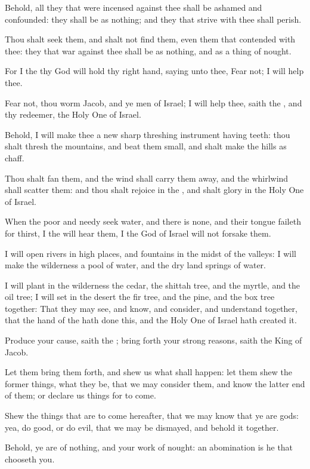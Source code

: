 \Verse Behold, all they that were incensed against thee shall be ashamed and confounded: they shall be as nothing; and they that strive with thee shall perish.

\Verse Thou shalt seek them, and shalt not find them, even them that contended with thee: they that war against thee shall be as nothing, and as a thing of nought.

\Verse For I the \LORD thy God will hold thy right hand, saying unto thee, Fear not; I will help thee.

\Verse Fear not, thou worm Jacob, and ye men of Israel; I will help thee, saith the \LORD, and thy redeemer, the Holy One of Israel.

\Verse Behold, I will make thee a new sharp threshing instrument having teeth: thou shalt thresh the mountains, and beat them small, and shalt make the hills as chaff.

\Verse Thou shalt fan them, and the wind shall carry them away, and the whirlwind shall scatter them: and thou shalt rejoice in the \LORD, and shalt glory in the Holy One of Israel.

\Verse When the poor and needy seek water, and there is none, and their tongue faileth for thirst, I the \LORD will hear them, I the God of Israel will not forsake them.

\Verse I will open rivers in high places, and fountains in the midst of the valleys: I will make the wilderness a pool of water, and the dry land springs of water.

\Verse I will plant in the wilderness the cedar, the shittah tree, and the myrtle, and the oil tree; I will set in the desert the fir tree, and the pine, and the box tree together: \Verse That they may see, and know, and consider, and understand together, that the hand of the \LORD hath done this, and the Holy One of Israel hath created it.

\Verse Produce your cause, saith the \LORD; bring forth your strong reasons, saith the King of Jacob.

\Verse Let them bring them forth, and shew us what shall happen: let them shew the former things, what they be, that we may consider them, and know the latter end of them; or declare us things for to come.

\Verse Shew the things that are to come hereafter, that we may know that ye are gods: yea, do good, or do evil, that we may be dismayed, and behold it together.

\Verse Behold, ye are of nothing, and your work of nought: an abomination is he that chooseth you.

